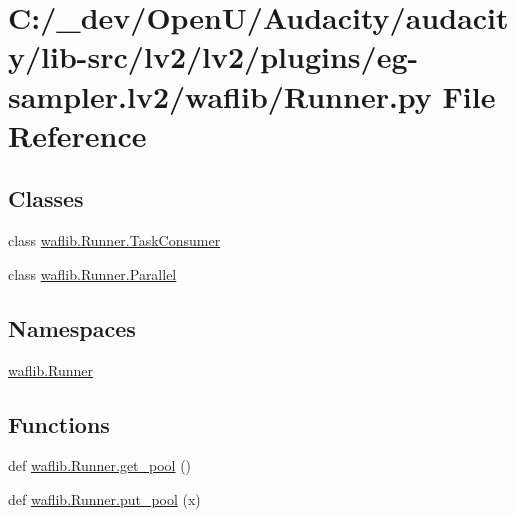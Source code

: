\hypertarget{lv2_2plugins_2eg-sampler_8lv2_2waflib_2_runner_8py}{}\section{C\+:/\+\_\+dev/\+Open\+U/\+Audacity/audacity/lib-\/src/lv2/lv2/plugins/eg-\/sampler.lv2/waflib/\+Runner.py File Reference}
\label{lv2_2plugins_2eg-sampler_8lv2_2waflib_2_runner_8py}
\subsection*{Classes}
\begin{DoxyCompactItemize}
\item 
class \hyperlink{classwaflib_1_1_runner_1_1_task_consumer}{waflib.\+Runner.\+Task\+Consumer}
\item 
class \hyperlink{classwaflib_1_1_runner_1_1_parallel}{waflib.\+Runner.\+Parallel}
\end{DoxyCompactItemize}
\subsection*{Namespaces}
\begin{DoxyCompactItemize}
\item 
 \hyperlink{namespacewaflib_1_1_runner}{waflib.\+Runner}
\end{DoxyCompactItemize}
\subsection*{Functions}
\begin{DoxyCompactItemize}
\item 
def \hyperlink{namespacewaflib_1_1_runner_a30bf6bcb906d0ab627890f2174b1e463}{waflib.\+Runner.\+get\+\_\+pool} ()
\item 
def \hyperlink{namespacewaflib_1_1_runner_a1e26175912d7655d9c38a50d71caeb6f}{waflib.\+Runner.\+put\+\_\+pool} (x)
\end{DoxyCompactItemize}
